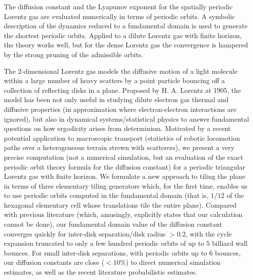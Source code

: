 
The diffusion constant and the Lyapunov exponent for the spatially
periodic Lorentz gas are evaluated numerically in terms of periodic
orbits. A symbolic description of the dynamics reduced to a fundamental
domain is used to generate the shortest periodic orbits. Applied to a
dilute Lorentz gas with finite horizon, the theory works well, but for
the dense Lorentz gas the convergence is hampered by the strong pruning
of the admissible orbits.

\bigskip\bigskip

The 2-dimensional Lorentz gas models the diffusive motion of a light
molecule within a large number of heavy scatters by a point particle
bouncing off a collection of reflecting disks in a plane. Proposed by H.
A. Lorentz at 1905, the model has been not only useful in studying dilute
electron gas thermal and diffusive properties (in approximation where
electron-electron interactions are ignored), but also in dynamical
systems/statistical physics to answer fundamental questions on how
ergodicity arises from determinism. Motivated by a recent potential
application to macroscopic transport (statistics of robotic locomotion
paths over a heterogeneous terrain strewn with scatterers), we present a
very precise computation (not a numerical simulation, but an evaluation
of the exact periodic orbit theory formula for the diffusion constant)
for a periodic triangular Lorentz gas with finite horizon. We formulate a
new approach to tiling the plane in terms of three elementary tiling
generators which, for the first time, enables us to use periodic orbits
computed in the fundamental domain (that is, $1/12$ of the hexagonal
elementary cell whose translations tile the entire plane). Compared with
previous literature (which, amusingly, explicitly states that our
calculation cannot be done), our fundamental domain value of the
diffusion constant converges quickly for inter-disk separation/disk
radius $>0.2$, with the cycle expansion truncated to only a few hundred
periodic orbits of up to $5$ billiard wall bounces. For small inter-disk
separations, with periodic orbits up to $6$ bounces, our diffusion
constants are close ($<10\%$) to direct numerical simulation estimates,
as well as the recent literature probabilistic estimates.
